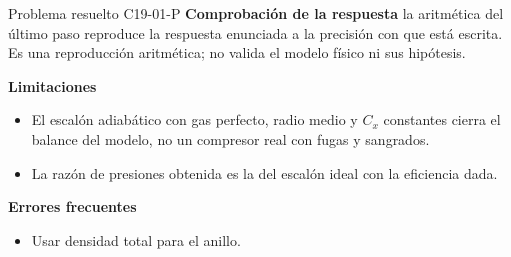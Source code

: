 \documentclass[10pt,openany]{book}
\begin{document}
\begin{studiumworked}{Problema resuelto C19-01-P}
\noindent\textbf{Comprobación de la respuesta} la aritmética del último paso reproduce la respuesta enunciada a la precisión con que está escrita. Es una reproducción aritmética; no valida el modelo físico ni sus hipótesis.

\noindent\textbf{Limitaciones}
\begin{itemize}
\item El escalón adiabático con gas perfecto, radio medio y $C_x$ constantes cierra el balance del modelo, no un compresor real con fugas y sangrados.
\item La razón de presiones obtenida es la del escalón ideal con la eficiencia dada.
\end{itemize}

\noindent\textbf{Errores frecuentes}
\begin{itemize}
\item Usar densidad total para el anillo.
\end{itemize}
\begin{center}\end{center}
\end{studiumworked}
\end{document}
